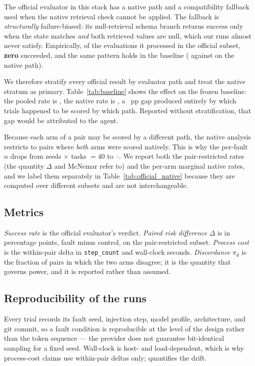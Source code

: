 The official evaluator in this stack has a native path and a compatibility
fallback used when the native retrieval check cannot be applied. The fallback is
\emph{structurally} failure-biased: its null-retrieval schema branch returns
success only when the state matches \emph{and} both retrieved values are null,
which our runs almost never satisfy. Empirically, of the \OfficialFallbackN{}
evaluations it processed in the official subset, \textbf{zero} succeeded, and the
same pattern holds in the baseline (\BaseFallbackRate{} against
\BaseNativeRate{} on the native path).

We therefore stratify every official result by evaluator path and treat the
native stratum as primary. Table~\ref{tab:baseline} shows the effect on the
frozen baseline: the pooled rate is \BasePooledRate{}, the native rate is
\BaseNativeRate{}, a \BaselineSwing{}~pp gap produced entirely by which trials
happened to be scored by which path. Reported without stratification, that gap
would be attributed to the agent.

Because each arm of a pair may be scored by a different path, the native
analysis restricts to pairs where \emph{both} arms were scored natively. This is
why the per-fault $n$ drops from \TrialsPerCell{} seeds $\times$
\OfficialTasks{} tasks $= 40$ to \ResWebDomMissingNNat--\ResWebTimeoutNNat{}. We
report both the pair-restricted rates (the quantity $\Delta$ and McNemar refer
to) and the per-arm marginal native rates, and we label them separately in
Table~\ref{tab:official_native} because they are computed over different subsets
and are not interchangeable.

\subsection{Metrics}
\label{sec:metrics}

\emph{Success rate} is the official evaluator's verdict. \emph{Paired risk
difference} $\Delta$ is in percentage points, fault minus control, on the
pair-restricted subset. \emph{Process cost} is the within-pair delta in
\texttt{step\_count} and wall-clock seconds. \emph{Discordance} $\pi_d$ is the
fraction of pairs in which the two arms disagree; it is the quantity that governs
power, and it is reported rather than assumed.

\subsection{Reproducibility of the runs}
\label{sec:runs}

Every trial records its fault seed, injection step, model profile, architecture,
and git commit, so a fault condition is reproducible at the level of the design
rather than the token sequence --- the provider does not guarantee bit-identical
sampling for a fixed seed. Wall-clock is host- and load-dependent, which is why
process-cost claims use within-pair deltas only;  quantifies the
drift.
